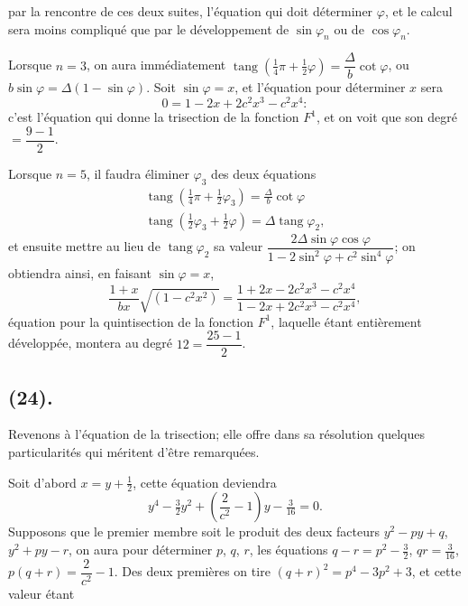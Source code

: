 \documentclass{article}
\begin{document}
par la rencontre de ces deux suites, l'équation qui doit déterminer $\varphi$, et le calcul sera moins compliqué que par le développement de $\sin\varphi_{n}$ ou de $\cos\varphi_{n}$.

Lorsque $n=3$, on aura immédiatement $\operatorname{tang}(\frac{1}{4}\pi+\frac{1}{2}\varphi)=\dfrac{\Delta}{b}\cot\varphi$, ou $b\sin\varphi=\Delta(1-\sin\varphi)$. Soit $\sin\varphi=x$, et l'équation pour déterminer $x$ sera
\[ 0=1-2x+2c^{2}x^{3}-c^{2}x^{4}: \]
c'est l'équation qui donne la trisection de la fonction $F^{1}$, et on voit que son degré $=\dfrac{9-1}{2}$.

Lorsque $n=5$, il faudra éliminer $\varphi_{3}$ des deux équations
\[ \begin{gathered} \operatorname{tang}(\tfrac{1}{4}\pi+\tfrac{1}{2}\varphi_{3})=\frac{\Delta}{b}\cot\varphi \\ \operatorname{tang}(\tfrac{1}{2}\varphi_{3}+\tfrac{1}{2}\varphi)=\Delta\operatorname{tang}\varphi_{2}, \end{gathered} \]
et ensuite mettre au lieu de $\operatorname{tang}\varphi_{2}$ sa valeur $\dfrac{2\Delta\sin\varphi\cos\varphi}{1-2\sin^{2}\varphi+c^{2}\sin^{4}\varphi}$; on obtiendra ainsi, en faisant $\sin\varphi=x$,
\[ \frac{1+x}{bx}\sqrt{(1-c^{2}x^{2})}=\frac{1+2x-2c^{2}x^{3}-c^{2}x^{4}}{1-2x+2c^{2}x^{3}-c^{2}x^{4}}, \]
équation pour la quintisection de la fonction $F^{1}$, laquelle étant entièrement développée, montera au degré $12=\dfrac{25-1}{2}$.

\subsection*{(24).}

Revenons à l'équation de la trisection; elle offre dans sa résolution quelques particularités qui méritent d'être remarquées.

Soit d'abord $x=y+\frac{1}{2}$, cette équation deviendra
\[ y^{4}-\tfrac{3}{2}y^{2}+\left(\frac{2}{c^{2}}-1\right)y-\tfrac{3}{16}=0. \]
Supposons que le premier membre soit le produit des deux facteurs $y^{2}-py+q$, $y^{2}+py-r$, on aura pour déterminer $p$, $q$, $r$, les équations $q-r=p^{2}-\frac{3}{2}$, $qr=\frac{3}{16}$, $p(q+r)=\dfrac{2}{c^{2}}-1$. Des deux premières on tire $(q+r)^{2}=p^{4}-3p^{2}+3$, et cette valeur étant
\end{document}
